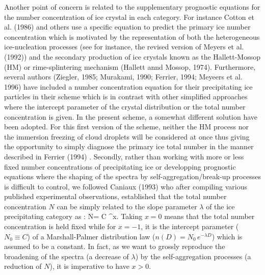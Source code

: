 Another point of concern is related to the supplementary prognostic equations
for the number concentration of ice crystal in each category. For instance
Cotton et al. (1986) and others use a specific equation to predict the primary
ice number concentration which is motivated by the representation of both the
heterogeneous ice-nucleation processes (see for instance, the revised version of
Meyers et al. (1992)) and the secondary production of ice crystals known as the
Hallett-Mossop (HM) or rime-splintering mechanism (Hallett annd Mossop, 1974).
Furthermore, several authors (Ziegler, 1985; Murakami, 1990; Ferrier, 1994;
Meyeers et al. 1996) have included a number concentration equation
for their precipitating ice particles in their scheme which is in contrast with
other simplified approaches where the intercept parameter of the crystal
distribution or the total number concentration is given. In the present scheme,
a somewhat different solution have been adopted. For this first version of the
scheme, neither the HM process nor the immersion freezing of cloud droplets
will be
considered at once thus giving the opportunity to simply diagnose\footnotemark
%
%
the primary ice total number in the manner described in Ferrier (1994)\footnotemark
%
%
. Secondly, rather than working with more or less
fixed number concentrations of precipitating ice or developping prognostic
equations where the shaping of the spectra by self-aggregation/break-up
processes is difficult to control, we followed Caniaux (1993) who after
compiling various published experimental observations, established that the
total number concentration $N$ can be simply related to the slope parameter
$\lambda$ of the ice precipitating category as\footnotemark
%
:
%
\be\label{eq1}
N= C \lambda^x.
\ee
%
\noindent Taking $x=0$ means that the total number concentration is held fixed
while for $x=-1$, it is the intercept parameter ($N_0 \equiv C$) of a
Marshall-Palmer distribution law ($n(D)=N_0\,e^{-\lambda D}$) which is assumed
to be a constant. In fact, as we want to grossly reproduce the broadening of
the spectra (a decrease of $\lambda$) by the self-aggregation processes (a
reduction of $N$), it is imperative to have $x>0$.

